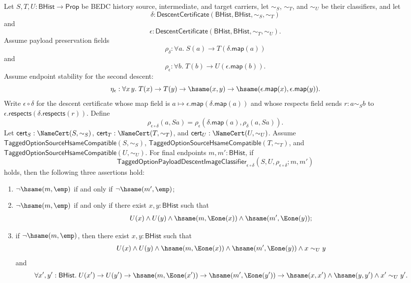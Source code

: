\begin{theorem}
Let $S,T,U:\mathsf{BHist}\to\mathsf{Prop}$ be BEDC history source,
intermediate, and target carriers, let $\sim_S$, $\sim_T$, and $\sim_U$ be their
classifiers, and let
$$
\delta:\mathsf{DescentCertificate}(\mathsf{BHist},\mathsf{BHist},\sim_S,\sim_T)
$$
and
$$
\epsilon:\mathsf{DescentCertificate}(\mathsf{BHist},\mathsf{BHist},\sim_T,\sim_U).
$$
Assume payload preservation fields
$$
\rho_{\delta}:\forall a.\;S(a)\to T(\delta.\mathsf{map}(a))
$$
and
$$
\rho_{\epsilon}:\forall b.\;T(b)\to U(\epsilon.\mathsf{map}(b)).
$$
Assume endpoint stability for the second descent:
$$
\eta_{\epsilon}:\forall x\,y.\;
T(x)\to T(y)\to \hsame(x,y)\to
\hsame(\epsilon.\mathsf{map}(x),\epsilon.\mathsf{map}(y)).
$$
Write $\epsilon\circ\delta$ for the descent certificate whose map field is
$a\mapsto\epsilon.\mathsf{map}(\delta.\mathsf{map}(a))$ and whose respects field
sends $r:a\sim_S b$ to
$\epsilon.\mathsf{respects}(\delta.\mathsf{respects}(r))$. Define
$$
\rho_{\epsilon\circ\delta}(a,Sa)=
\rho_{\epsilon}(\delta.\mathsf{map}(a),\rho_{\delta}(a,Sa)).
$$
Let $\mathsf{cert}_S:\NameCert(S,\sim_S)$,
$\mathsf{cert}_T:\NameCert(T,\sim_T)$, and
$\mathsf{cert}_U:\NameCert(U,\sim_U)$. Assume
$\mathsf{TaggedOptionSourceHsameCompatible}(S,\sim_S)$,
$\mathsf{TaggedOptionSourceHsameCompatible}(T,\sim_T)$, and
$\mathsf{TaggedOptionSourceHsameCompatible}(U,\sim_U)$. For final endpoints
$m,m':\mathsf{BHist}$, if
$$
\mathsf{TaggedOptionPayloadDescentImageClassifier}_{\epsilon\circ\delta}
(S,U,\rho_{\epsilon\circ\delta};m,m')
$$
holds, then the following three assertions hold:
\begin{enumerate}
\item $\neg\hsame(m,\emp)$ if and only if $\neg\hsame(m',\emp)$;
\item $\neg\hsame(m,\emp)$ if and only if there exist
$x,y:\mathsf{BHist}$ such that
$$
U(x)\land U(y)\land
\hsame(m,\Eone(x))\land
\hsame(m',\Eone(y));
$$
\item if $\neg\hsame(m,\emp)$, then there exist $x,y:\mathsf{BHist}$ such that
$$
U(x)\land U(y)\land
\hsame(m,\Eone(x))\land
\hsame(m',\Eone(y))\land
x\sim_U y
$$
and
$$
\forall x',y':\mathsf{BHist}.\;
U(x')\to U(y')\to
\hsame(m,\Eone(x'))\to
\hsame(m',\Eone(y'))\to
\hsame(x,x')\land \hsame(y,y')\land x'\sim_U y'.
$$
\end{enumerate}
\end{theorem}
